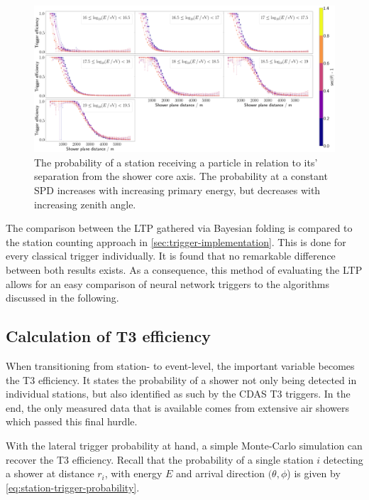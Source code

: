 \begin{figure}
	\centering
	\includegraphics[width=1\textwidth]{./plots/LPP.png}
	\caption{The probability of a station receiving a particle in relation to its' separation from the shower core axis. The probability at a constant SPD 
	increases with increasing primary energy, but decreases with increasing zenith angle.}
	\label{fig:fitfunction-comparison}
\end{figure}

The comparison between the LTP gathered via Bayesian folding is compared to the \Offline station counting approach in \autoref{sec:trigger-implementation}. This is
done for every classical trigger individually. It is found that no remarkable difference between both results exists. As a consequence, this method of evaluating 
the LTP allows for an easy comparison of neural network triggers to the algorithms discussed in the following. 

\subsection{Calculation of T3 efficiency}
\label{ssec:t3-calculation}

When transitioning from station- to event-level, the important variable becomes the T3 efficiency. It states the probability of a shower not only being detected
in individual stations, but also identified as such by the CDAS T3 triggers. In the end, the only measured data that is available comes from extensive air showers
which passed this final hurdle.

With the lateral trigger probability at hand, a simple Monte-Carlo simulation can recover the T3 efficiency. Recall that the probability of a single station $i$
detecting a shower at distance $r_i$, with energy $E$ and arrival direction $(\theta, \phi$) is given by \autoref{eq:station-trigger-probability}.

